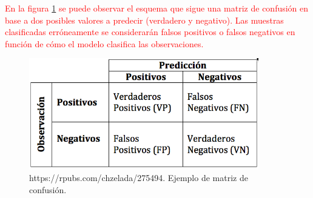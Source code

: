         \textcolor{red}{En la figura \ref{MatrizConfusionExampleImage} se puede observar el esquema que sigue una matriz de confusión en base a dos posibles valores a predecir (verdadero y negativo). Las muestras clasificadas erróneamente se considerarán falsos positivos o falsos negativos en función de cómo el modelo clasifica las observaciones.}

        \begin{figure}[h]
            \centering
            \includegraphics[width=10cm]{archivos/4.Metodologia/Metricas/MatrizConfusion}
            \caption{https://rpubs.com/chzelada/275494. Ejemplo de matriz de confusión.}
            \label{MatrizConfusionExampleImage}
         \end{figure}

\newpage
